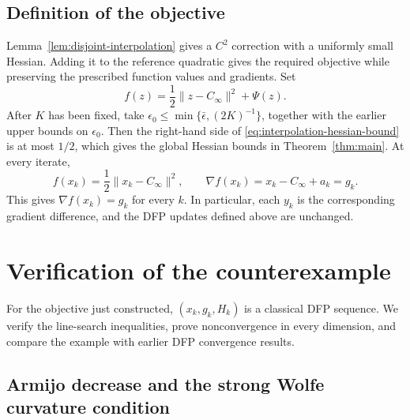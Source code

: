 \documentclass[11pt]{article}
\begin{document}
\subsection{Definition of the objective}

Lemma~\ref{lem:disjoint-interpolation} gives a $C^2$ correction with a
uniformly small Hessian.  Adding it to the reference quadratic gives the
required objective while preserving the prescribed function values and
gradients.  Set
\begin{equation}\label{eq:objective}
f(z)=\frac12\|z-C_\infty\|^2+\Psi(z).
\end{equation}
After $K$ has been fixed, take
$\epsilon_0\le\min\{\bar\epsilon,(2K)^{-1}\}$, together with the earlier
upper bounds on $\epsilon_0$.  Then the right-hand side of
\eqref{eq:interpolation-hessian-bound} is at most $1/2$, which gives the global
Hessian bounds in Theorem~\ref{thm:main}.  At every iterate,
\begin{equation}\label{eq:endpoint-data}
f(x_k)=\frac12\|x_k-C_\infty\|^2,
\qquad
\nabla f(x_k)=x_k-C_\infty+a_k=g_k.
\end{equation}
This gives $\nabla f(x_k)=g_k$ for every $k$.  In particular, each $y_k$ is the
corresponding gradient difference, and the DFP updates defined above are
unchanged.

\section{Verification of the counterexample}
\label{sec:completion}

For the objective just constructed, $(x_k,g_k,H_k)$ is a classical DFP
sequence.  We verify the line-search inequalities, prove nonconvergence in
every dimension, and compare the example with earlier DFP convergence results.

\subsection{Armijo decrease and the strong Wolfe curvature condition}
\end{document}
